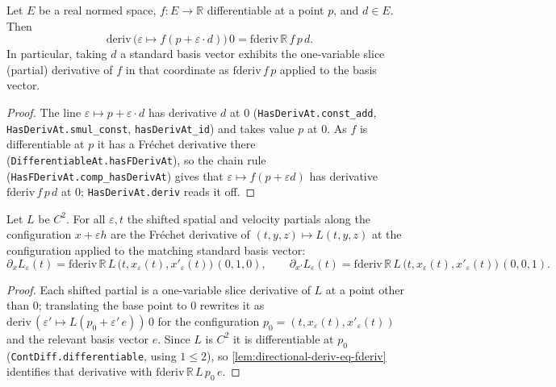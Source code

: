 \begin{lemma}
    \label{lem:directional-deriv-eq-fderiv}
    \leanok
    Let $E$ be a real normed space, $f : E \to \mathbb{R}$ differentiable at a
    point $p$, and $d \in E$. Then
    \[
      \mathrm{deriv}\,\bigl(\varepsilon \mapsto f(p + \varepsilon \cdot d)\bigr)\,0
        = \mathrm{fderiv}\,\mathbb{R}\, f\, p\, d .
    \]
    In particular, taking $d$ a standard basis vector exhibits the one-variable
    slice (partial) derivative of $f$ in that coordinate as
    $\mathrm{fderiv}\,f\,p$ applied to the basis vector.
\end{lemma}
\begin{proof}
    The line $\varepsilon \mapsto p + \varepsilon \cdot d$ has derivative $d$ at
    $0$ (\texttt{HasDerivAt.const\_add}, \texttt{HasDerivAt.smul\_const},
    \texttt{hasDerivAt\_id}) and takes value $p$ at $0$. As $f$ is differentiable
    at $p$ it has a Fr\'echet derivative there
    (\texttt{DifferentiableAt.hasFDerivAt}), so the chain rule
    (\texttt{HasFDerivAt.comp\_hasDerivAt}) gives that
    $\varepsilon \mapsto f(p + \varepsilon d)$ has derivative
    $\mathrm{fderiv}\,f\,p\,d$ at $0$; \texttt{HasDerivAt.deriv} reads it off.
\end{proof}

\begin{lemma}
    \label{lem:shifted-partial-eq-fderiv}
    \leanok
    Let $L$ be $C^2$. For all $\varepsilon, t$ the shifted spatial and velocity
    partials along the configuration $x + \varepsilon h$ are the Fr\'echet
    derivative of $(t, y, z) \mapsto L(t, y, z)$ at the configuration applied to
    the matching standard basis vector:
    \[
      \partial_x L_\varepsilon(t)
        = \mathrm{fderiv}\,\mathbb{R}\, L\,
          \bigl(t, x_\varepsilon(t), x'_\varepsilon(t)\bigr)\,(0,1,0),
      \qquad
      \partial_{x'} L_\varepsilon(t)
        = \mathrm{fderiv}\,\mathbb{R}\, L\,
          \bigl(t, x_\varepsilon(t), x'_\varepsilon(t)\bigr)\,(0,0,1).
    \]
\end{lemma}
\begin{proof}
    Each shifted partial is a one-variable slice derivative of $L$ at a point
    other than $0$; translating the base point to $0$ rewrites it as
    $\mathrm{deriv}\,(\varepsilon' \mapsto L(p_0 + \varepsilon'\, e))\,0$ for the
    configuration $p_0 = (t, x_\varepsilon(t), x'_\varepsilon(t))$ and the
    relevant basis vector $e$. Since $L$ is $C^2$ it is differentiable at $p_0$
    (\texttt{ContDiff.differentiable}, using $1 \le 2$), so
    \cref{lem:directional-deriv-eq-fderiv} identifies that derivative with
    $\mathrm{fderiv}\,\mathbb{R}\,L\,p_0\,e$.
\end{proof}

